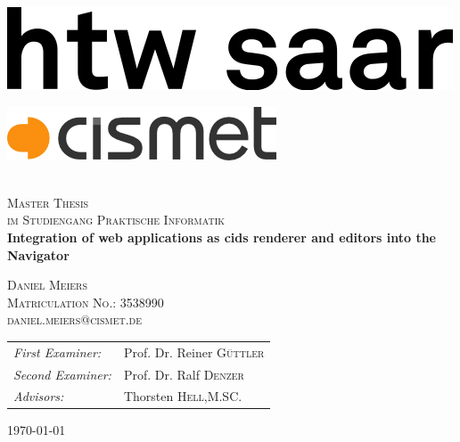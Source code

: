 \begin{titlepage}
\begin{center}

\begin{minipage}[t]{0.4\textwidth}
	\begin{flushleft}
	\includegraphics[width=\textwidth]{preamble/img/logo_htw_saar}
	\end{flushleft}
\end{minipage}
\hfill
\begin{minipage}[t]{0.4\textwidth}
	\begin{flushright}
	\includegraphics[width=\textwidth]{preamble/img/logo_cismet_grey}
	\end{flushright}
\end{minipage}



~\\[1cm]

\textsc{\LARGE Master Thesis}\\
\textsc{\large im Studiengang Praktische Informatik}\\[1.5cm]
\hspace{0.4cm}
{ \huge \bfseries Integration of web applications as cids renderer and editors into the Navigator\\[0.4cm] }

\hspace{1.5cm}

\textsc{\large Daniel Meiers}\\[0.2cm]
\textsc{\large Matriculation No.: 3538990}\\[0.2cm]
\textsc{\large daniel.meiers@cismet.de}\\[4cm]

\begin{tabular}[0.8\textwidth]{l l}
\emph{First Examiner:} & Prof. Dr. Reiner \textsc{Güttler}  \\
\emph{Second Examiner:} &  Prof. Dr. Ralf \textsc{Denzer}\\
\emph{Advisors:} & Thorsten \textsc{Hell},M.SC.
\end{tabular}


\vfill

{\large \today}

\end{center}
\end{titlepage}